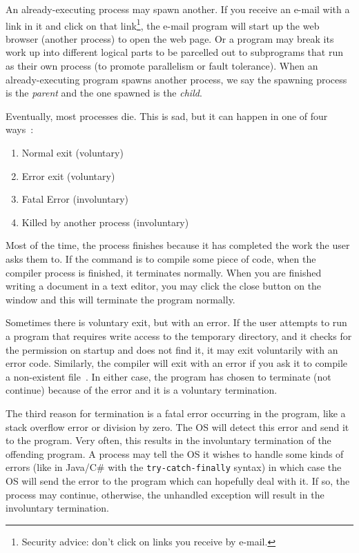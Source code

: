 An already-executing process may spawn another. If you receive an e-mail with a link in it and click on that link\footnote{Security advice: don't click on links you receive by e-mail.}, the e-mail program will start up the web browser (another process) to open the web page. Or a program may break its work up into different logical parts to be parcelled out to subprograms that run as their own process (to promote parallelism or fault tolerance). When an already-executing program spawns another process, we say the spawning process is the \textit{parent} and the one spawned is the \textit{child}.

Eventually, most processes die. This is sad, but it can happen in one of four ways~\cite{mos}:
\begin{enumerate}
	\item Normal exit (voluntary)
	\item Error exit (voluntary)
	\item Fatal Error (involuntary)
	\item Killed by another process (involuntary)
\end{enumerate}

Most of the time, the process finishes because it has completed the work the user asks them to. If the command is to compile some piece of code, when the compiler process is finished, it terminates normally. When you are finished writing a document in a text editor, you may click the close button on the window and this will terminate the program normally.

Sometimes there is voluntary exit, but with an error. If the user attempts to run a program that requires write access to the temporary directory, and it checks for the permission on startup and does not find it, it may exit voluntarily with an error code. Similarly, the compiler will exit with an error if you ask it to compile a non-existent file~\cite{mos}. In either case, the program has chosen to terminate (not continue) because of the error and it is a voluntary termination.

The third reason for termination is a fatal error occurring in the program, like a stack overflow error or division by zero. The OS will detect this error and send it to the program. Very often, this results in the involuntary termination of the offending program. A process may tell the OS it wishes to handle some kinds of errors (like in Java/C\# with the \texttt{try-catch-finally} syntax) in which case the OS will send the error to the program which can hopefully deal with it. If so, the process may continue, otherwise, the unhandled exception will result in the involuntary termination.

